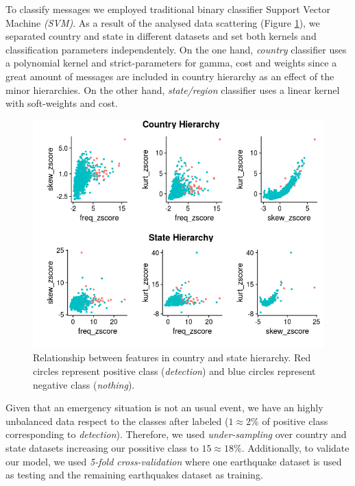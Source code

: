 \documentclass[sigconf]{acmart}
\begin{document}
To classify messages we employed traditional binary classifier Support Vector Machine \textit{(SVM)}. As a result of the analysed data scattering (Figure \ref{fig:scatter}), we separated country and state in different datasets and set both kernels and classification parameters independentely. On the one hand, \textit{country} classifier uses a polynomial kernel and strict-parameters for gamma, cost and weights since a great amount of messages are included in country hierarchy as an effect of the minor hierarchies. On the other hand, \textit{state/region} classifier uses a linear kernel with soft-weights and cost.

\begin{figure}
	\centering
	\includegraphics[width=\columnwidth]{img/scatter.png}
	\caption{Relationship between features in country and state hierarchy. Red circles represent positive class (\textit{detection}) and blue circles represent negative class (\textit{nothing}).}
	\label{fig:scatter}
\end{figure}


Given that an emergency situation is not an usual event, we have an highly unbalanced data respect to the classes after labeled ($1\approx2\%$ of positive class corresponding to \textit{detection}). Therefore, we used \textit{under-sampling} \cite{lunardon2014rose} over country and state datasets increasing our possitive class to $15\approx18\%$. Additionally, to validate our model, we used \textit{5-fold cross-validation} where one earthquake dataset is used as testing and the remaining earthquakes dataset as training.
\end{document}
